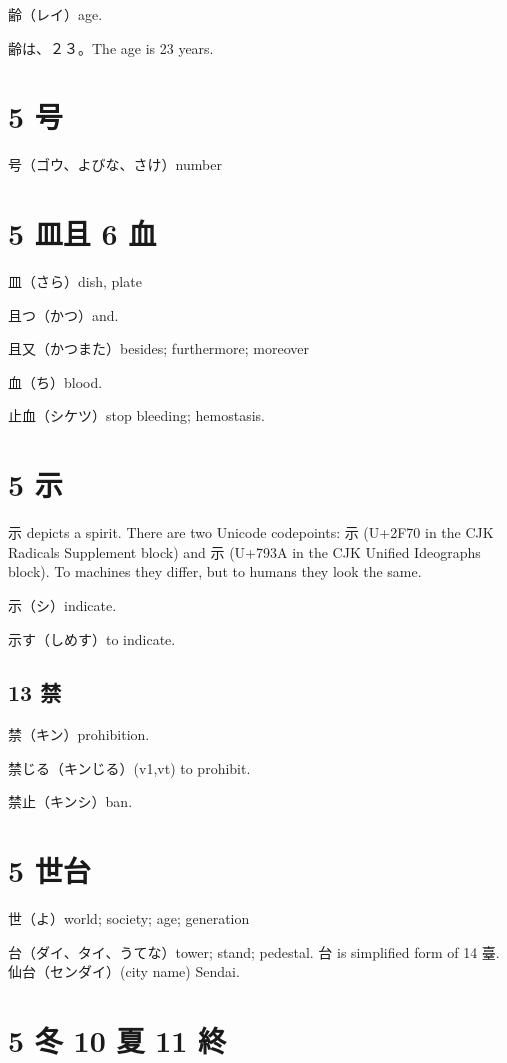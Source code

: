 齢（レイ）age.

齢は、２３。The age is 23 years.

\section{5 号}

号（ゴウ、よびな、さけ）number

\section{5 皿且 6 血}

皿（さら）dish, plate

且つ（かつ）and.

且又（かつまた）besides; furthermore; moreover

血（ち）blood.

止血（シケツ）stop bleeding; hemostasis.

\section{5 示}

示 depicts a spirit.
There are two Unicode codepoints:
⽰ (U+2F70 in the CJK Radicals Supplement block)
and 示 (U+793A in the CJK Unified Ideographs block).
To machines they differ,
but to humans they look the same.

示（シ）indicate.

示す（しめす）to indicate.

\subsection{13 禁}

禁（キン）prohibition.

禁じる（キンじる）(v1,vt) to prohibit.

禁止（キンシ）ban.

\section{5 世台}

世（よ）world; society; age; generation

台（ダイ、タイ、うてな）tower; stand; pedestal.
台 is simplified form of 14 臺.
仙台（センダイ）(city name) Sendai.

\section{5 冬 10 夏 11 終}

